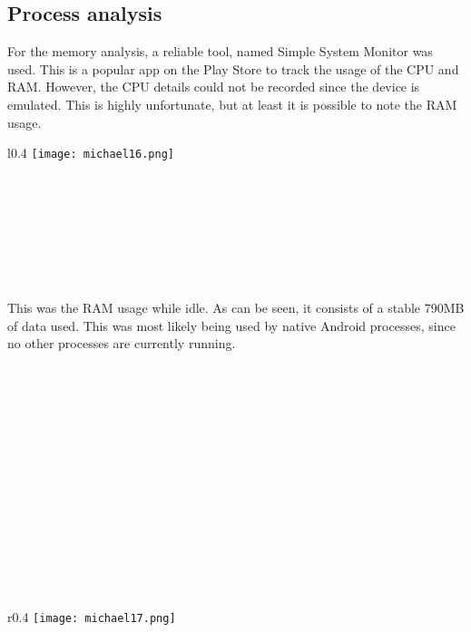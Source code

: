{{{{\newpage
\subsection{Process analysis}
For the memory analysis, a reliable tool, named Simple System Monitor was used. This is a popular app on the Play Store to track the usage of the CPU and RAM. However, the CPU details could not be recorded since the device is emulated. This is highly unfortunate, but at least it is possible to note the RAM usage.

\begin{minipage}{\linewidth}
\begin{wrapfigure}{l}{0.4\textwidth}
\centering
\texttt{[image: michael16.png]}
\end{wrapfigure}
~\\
~\\
~\\
~\\
~\\
~\\
~\\

This was the RAM usage while idle. As can be seen, it consists of a stable 790MB of data used. This was most likely being used by native Android processes, since no other processes are currently running.
\end{minipage}
~\\
~\\
~\\
~\\
~\\
~\\
~\\
~\\
~\\
~\\
~\\
~\\
~\\

\begin{minipage}{\linewidth}
\begin{wrapfigure}{r}{0.4\textwidth}
\centering
\texttt{[image: michael17.png]}
\end{wrapfigure}
~\\
~\\
~\\
~\\
~\\
~\\
~\\


\end{minipage}}}}}
